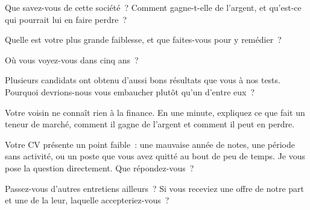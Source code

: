 \begin{question}\label{iq:iv2:behavioural-and-fit:5}
Que savez-vous de cette société~? Comment gagne-t-elle de l'argent, et qu'est-ce qui pourrait lui en faire perdre~?
\end{question}

\begin{question}\label{iq:iv2:behavioural-and-fit:6}
Quelle est votre plus grande faiblesse, et que faites-vous pour y remédier~?
\end{question}

\begin{question}\label{iq:iv2:behavioural-and-fit:7}
Où vous voyez-vous dans cinq ans~?
\end{question}

\begin{question}\label{iq:iv2:behavioural-and-fit:8}
Plusieurs candidats ont obtenu d'aussi bons résultats que vous à nos tests. Pourquoi devrions-nous vous embaucher plutôt qu'un d'entre eux~?
\end{question}

\begin{question}\label{iq:iv2:behavioural-and-fit:9}
Votre voisin ne connaît rien à la finance. En une minute, expliquez ce que fait un teneur de marché, comment il gagne de l'argent et comment il peut en perdre.
\end{question}

\begin{question}\label{iq:iv2:behavioural-and-fit:10}
Votre CV présente un point faible~: une mauvaise année de notes, une période sans activité, ou un poste que vous avez quitté au bout de peu de temps. Je vous pose la question directement. Que répondez-vous~?
\end{question}

\begin{question}\label{iq:iv2:behavioural-and-fit:11}
Passez-vous d'autres entretiens ailleurs~? Si vous receviez une offre de notre part et une de la leur, laquelle accepteriez-vous~?
\end{question}

